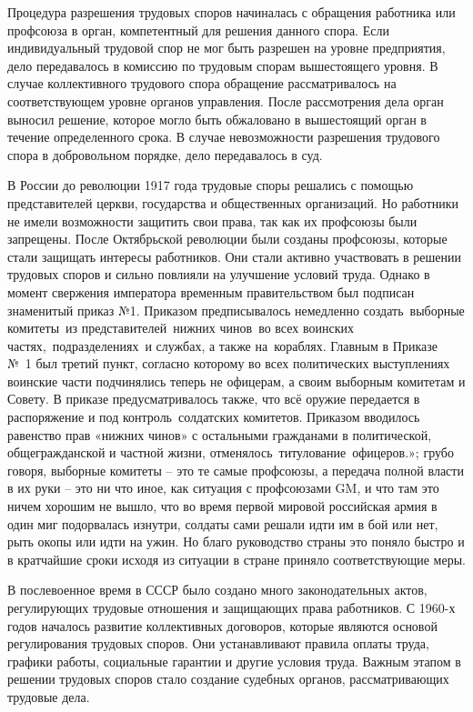 Процедура разрешения трудовых споров начиналась с обращения работника или профсоюза в орган, компетентный для решения данного спора. Если индивидуальный трудовой спор не мог быть разрешен на уровне предприятия, дело передавалось в комиссию по трудовым спорам вышестоящего уровня. В случае коллективного трудового спора обращение рассматривалось на соответствующем уровне органов управления. После рассмотрения дела орган выносил решение, которое могло быть обжаловано в вышестоящий орган в течение определенного срока. В случае невозможности разрешения трудового спора в добровольном порядке, дело передавалось в суд. 

В России до революции 1917 года трудовые споры решались с помощью представителей церкви, государства и общественных организаций. Но работники не имели возможности защитить свои права, так как их профсоюзы были запрещены. После Октябрьской революции были созданы профсоюзы, которые стали защищать интересы работников. Они стали активно участвовать в решении трудовых споров и сильно повлияли на улучшение условий труда. Однако в момент свержения императора временным правительством был подписан знаменитый приказ №1. Приказом предписывалось немедленно создать выборные комитеты из представителей нижних чинов во всех воинских частях, подразделениях и службах, а также на кораблях. Главным в Приказе № 1 был третий пункт, согласно которому во всех политических выступлениях воинские части подчинялись теперь не офицерам, а своим выборным комитетам и Совету. В приказе предусматривалось также, что всё оружие передается в распоряжение и под контроль солдатских комитетов. Приказом вводилось равенство прав «нижних чинов» с остальными гражданами в политической, общегражданской и частной жизни, отменялось титулование офицеров.»; грубо говоря, выборные комитеты -- это те самые профсоюзы, а передача полной власти в их руки -- это ни что иное, как ситуация с профсоюзами GM, и что там это ничем хорошим не вышло, что во время первой мировой российская армия в один миг подорвалась изнутри, солдаты сами решали идти им в бой или нет, рыть окопы или идти на ужин. Но благо руководство страны это поняло быстро и в кратчайшие сроки исходя из ситуации в стране приняло соответствующие меры.

В послевоенное время в СССР было создано много законодательных актов, регулирующих трудовые отношения и защищающих права работников. С 1960-х годов началось развитие коллективных договоров, которые являются основой регулирования трудовых споров. Они устанавливают правила оплаты труда, графики работы, социальные гарантии и другие условия труда. Важным этапом в решении трудовых споров стало создание судебных органов, рассматривающих трудовые дела.


